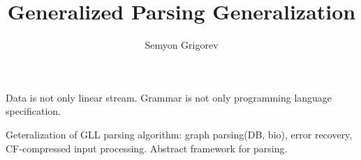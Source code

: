 \documentclass[12pt]{article}  %
\title{Generalized Parsing Generalization}
\author{Semyon Grigorev}
\theoremstyle{definition}
\theoremstyle{remark}
\begin{document}
\maketitle

Data is not only linear stream. Grammar is not only programming language specification.

Geteralization of GLL parsing algorithm: graph parsing(DB, bio), error recovery, CF-compressed input processing. Abstract framework for parsing.
\end{document}
